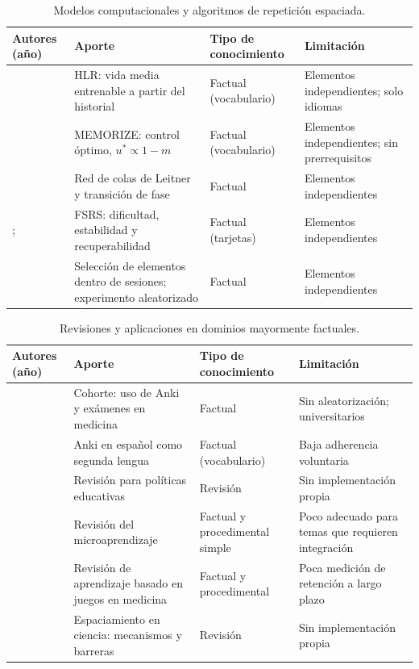 \documentclass[12pt]{article}
\theoremstyle{definition}
\begin{document}
\begin{table}[H]
\centering\small
\caption{Modelos computacionales y algoritmos de repetición espaciada.}
\label{tab:modelos}
\begin{tabularx}{\textwidth}{@{}P{2.7cm}YYY@{}}
\toprule
\textbf{Autores (año)} & \textbf{Aporte} & \textbf{Tipo de conocimiento} & \textbf{Limitación} \\
\midrule
\citet{settles2016} & HLR: vida media entrenable a partir del historial & Factual (vocabulario) & Elementos independientes; solo idiomas \\
\citet{tabibian2019} & MEMORIZE: control óptimo, $u^\ast\propto1-m$ & Factual (vocabulario) & Elementos independientes; sin prerrequisitos \\
\citet{reddy2016} & Red de colas de Leitner y transición de fase & Factual & Elementos independientes \\
\citet{ye2022}; \citet{su2023} & FSRS: dificultad, estabilidad y recuperabilidad & Factual (tarjetas) & Elementos independientes \\
\citet{upadhyay2021} & Selección de elementos dentro de sesiones; experimento aleatorizado & Factual & Elementos independientes \\
\bottomrule
\end{tabularx}
\end{table}

\begin{table}[H]
\centering\small
\caption{Revisiones y aplicaciones en dominios mayormente factuales.}
\label{tab:revisiones}
\begin{tabularx}{\textwidth}{@{}P{2.7cm}YYY@{}}
\toprule
\textbf{Autores (año)} & \textbf{Aporte} & \textbf{Tipo de conocimiento} & \textbf{Limitación} \\
\midrule
\citet{gilbert2023} & Cohorte: uso de Anki y exámenes en medicina & Factual & Sin aleatorización; universitarios \\
\citet{hanson2020} & Anki en español como segunda lengua & Factual (vocabulario) & Baja adherencia voluntaria \\
\citet{kang2016} & Revisión para políticas educativas & Revisión & Sin implementación propia \\
\citet{mostrady2025} & Revisión del microaprendizaje & Factual y procedimental simple & Poco adecuado para temas que requieren integración \\
\citet{xu2023} & Revisión de aprendizaje basado en juegos en medicina & Factual y procedimental & Poca medición de retención a largo plazo \\
\citet{yuan2022} & Espaciamiento en ciencia: mecanismos y barreras & Revisión & Sin implementación propia \\
\bottomrule
\end{tabularx}
\end{table}
\end{document}
